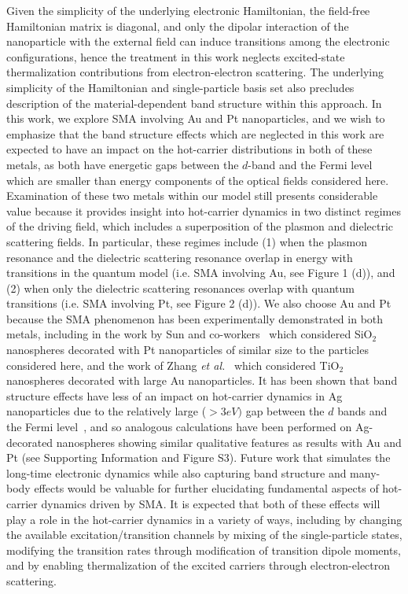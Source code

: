 \documentclass[journal=jpclcd,manuscript=article]{achemso}
\begin{document}
Given the simplicity of the underlying electronic Hamiltonian, the field-free Hamiltonian matrix is diagonal, and only the dipolar
interaction of the nanoparticle with the external field can induce transitions among the electronic configurations, hence the treatment in 
this work neglects excited-state thermalization contributions from electron-electron scattering. 
The underlying simplicity of the Hamiltonian and single-particle basis set also precludes description
of the material-dependent band structure within this approach.  
In this work, we explore SMA involving Au and Pt nanoparticles, and we wish to emphasize that the band structure effects 
which are neglected in this work are expected to have an impact on the hot-carrier distributions in both of these metals, 
as both have energetic gaps between the $d$-band and the Fermi level which are smaller than energy components of the optical fields
considered here.  Examination of these two metals within our model still presents considerable value because it provides
insight into hot-carrier dynamics in two distinct regimes of the driving field, which includes a superposition
of the plasmon and dielectric scattering fields.  In particular, these regimes include (1) when the plasmon 
resonance and the dielectric scattering resonance overlap in energy with transitions in the quantum model 
(i.e. SMA involving Au, see Figure 1 (d)), 
and (2) when only the dielectric scattering resonances overlap with 
quantum transitions (i.e. SMA involving Pt, see Figure 2 (d)).   
We also choose Au and Pt because the SMA phenomenon
has been experimentally demonstrated in both metals, including in the work by Sun and co-workers~\cite{ZHX_NatPhoton_2016} which
considered SiO$_2$ nanospheres decorated with Pt nanoparticles of similar size to the particles considered here, and the work of 
Zhang {\it et al.}~\cite{ZJM_ACSNano_2016} which considered
TiO$_2$ nanospheres decorated with large Au nanoparticles.  It has been shown that band structure effects have less of an impact
on hot-carrier dynamics in Ag nanoparticles due to the relatively large ($> 3eV)$ gap between the $d$ bands and the Fermi level~\cite{MLK_ACSNano_2014,Atwater_Review}, and so
analogous calculations have been performed on Ag-decorated nanospheres showing similar qualitative features
as results with Au and Pt (see Supporting Information and Figure S3).
Future work that simulates the long-time electronic dynamics while also capturing band structure
and many-body effects would be valuable for further elucidating fundamental aspects of hot-carrier dynamics driven by SMA.  
It is expected
that both of these effects will play a role in the hot-carrier dynamics in a variety of ways, including by changing the 
available excitation/transition channels
by mixing of the single-particle states, modifying the transition rates through 
modification of transition dipole moments, and by enabling
thermalization of the excited carriers through electron-electron scattering.
\end{document}

